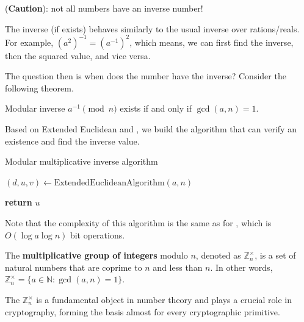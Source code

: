 \documentclass[../lecture-notes.tex]{subfiles}
\begin{document}
\begin{remark}
    (\textbf{Caution}): not all numbers have an inverse number!
\end{remark}

\begin{remark}
    The inverse (if exists) behaves similarly to the usual inverse over rations/reals. For example, $(a^{2})^{-1} = (a^{-1})^{2}$, which means, we can first find the inverse, then the squared value, and vice versa.
\end{remark}

The question then is when does the number have the inverse? Consider the following theorem.

\begin{theorem}\label{th:inverse_existence}
    Modular inverse $a^{-1} \pmod{n}$ exists if and only if $\gcd(a, n) = 1$.
\end{theorem}

Based on Extended Euclidean  and , we build the algorithm that can verify an existence and find the inverse value.

\begin{algorithm}
    \caption{Modular multiplicative inverse algorithm} \label{alg:modular_inverse}
        
    $(d, u, v) \gets \text{ExtendedEuclideanAlgorithm}(a, n)$ 


    \textbf{return} $u$
\end{algorithm}

\begin{remark}
    Note that the complexity of this algorithm is the same as for , which is $O(\log a \log n)$ bit operations.
\end{remark}

\begin{definition}
    The \textbf{multiplicative group of integers} modulo $n$, denoted as $\mathbb{Z}_n^{\times}$, is a set of natural numbers that are coprime to $n$ and less than $n$. In other words, $\mathbb{Z}_n^{\times} = \{a \in \mathbb{N}: \gcd(a, n) = 1\}$.
\end{definition}

The $\mathbb{Z}_{n}^{\times}$ is a fundamental object in number theory and 
plays a crucial role in cryptography, forming the basis almost for every cryptographic primitive.
\end{document}

